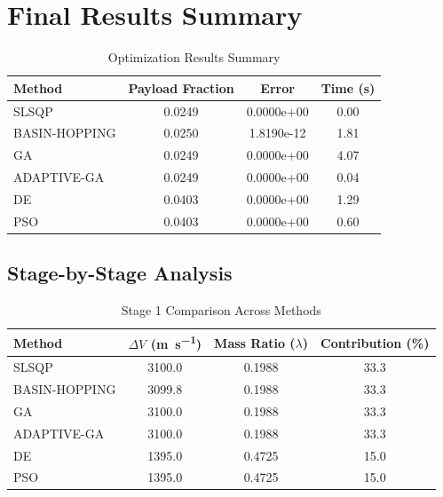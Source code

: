 \documentclass{article}
\begin{document}
\section{Final Results Summary}
\begin{table}[H]
\centering
\caption{Optimization Results Summary}
\begin{tabular}{lS[table-format=1.4]S[table-format=1.4e-1]S[table-format=1.2]}
\toprule
Method & {Payload Fraction} & {Error} & {Time (\si{\second})} \\
\midrule
SLSQP        & 0.0249 & 0.0000e+00 & 0.00 \\
BASIN-HOPPING & 0.0250 & 1.8190e-12 & 1.81 \\
GA           & 0.0249 & 0.0000e+00 & 4.07 \\
ADAPTIVE-GA  & 0.0249 & 0.0000e+00 & 0.04 \\
DE           & 0.0403 & 0.0000e+00 & 1.29 \\
PSO          & 0.0403 & 0.0000e+00 & 0.60 \\
\bottomrule
\end{tabular}
\end{table}

\subsection{Stage-by-Stage Analysis}


\begin{table}[H]
\centering
\caption{Stage 1 Comparison Across Methods}
\begin{tabular}{lS[table-format=4.1]S[table-format=1.4]S[table-format=3.1]}
\toprule
Method & {$\Delta V$ (\si{\meter\per\second})} & {Mass Ratio ($\lambda$)} & {Contribution (\%)} \\
\midrule
SLSQP        & 3100.0 & 0.1988 & 33.3 \\
BASIN-HOPPING & 3099.8 & 0.1988 & 33.3 \\
GA           & 3100.0 & 0.1988 & 33.3 \\
ADAPTIVE-GA  & 3100.0 & 0.1988 & 33.3 \\
DE           & 1395.0 & 0.4725 & 15.0 \\
PSO          & 1395.0 & 0.4725 & 15.0 \\
\bottomrule
\end{tabular}
\end{table}
\end{document}
